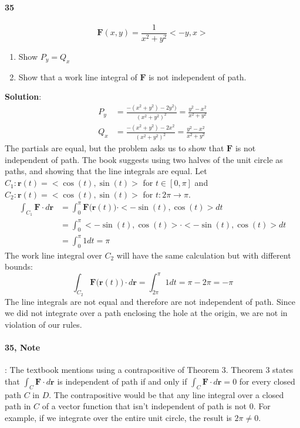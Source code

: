 \documentclass{article}
\begin{document}
    \paragraph{35}
    \[\mathbf{F}(x,y) = \frac{1}{x^2 + y^2}<-y, x>\]
    \begin{enumerate}[label=(\alph*)]
        \item Show $P_y = Q_x$
        \item Show that a work line integral of $\mathbf{F}$ is not independent of path.
    \end{enumerate}
    \textbf{Solution}:
    \begin{align*}
        P_y &= \frac{-(x^2+y^2)-2y^2)}{(x^2+y^2)^2} = \frac{y^2-x^2}{x^2+y^2}\\
        Q_x &= \frac{-(x^2+y^2)-2x^2}{(x^2+y^2)^2} = \frac{y^2-x^2}{x^2+y^2}
    \end{align*}
    The partials are equal, but the problem asks us to show that $\mathbf{F}$ is not independent of path.
    The book suggests using two halves of
    the unit circle as paths, and showing that the line integrals are equal.
    Let $C_1: \mathbf{r}(t) = <\cos(t), \sin(t)>$ for $t \in [0,\pi]$
    and $C_2: \mathbf{r}(t) = <\cos(t), \sin(t)>$ for $t: 2\pi \to \pi$.
    \begin{align*}
        \int_{C_1} \mathbf{F} \cdot d \mathbf{r} &= \int_{0}^{\pi} \mathbf{F(r}(t)) \cdot <-\sin(t), \cos(t)>dt\\
        &= \int_{0}^{\pi} <-\sin(t), \cos(t)> \cdot <-\sin(t), \cos(t)>dt \\
        &= \int_0^{\pi}1dt = \pi
    \end{align*}
    The work line integral over $C_2$ will have the same calculation but with different bounds:
    \[\int_{C_2} \mathbf{F(r}(t)) \cdot d\mathbf{r} = \int_{2\pi}^{\pi} 1 dt = \pi - 2\pi = -\pi\]
    The line integrals are not equal and therefore are not independent of path.
    Since we did not integrate over a path enclosing the hole at the origin, we are not in violation of our rules.
    \paragraph{35, Note}: The textbook mentions using a contrapositive of Theorem 3. Theorem 3 states that $\int_C \mathbf{F} \cdot d\mathbf{r}$ is independent
    of path if and only if $\int_C \mathbf{F} \cdot d\mathbf{r} = 0$ for every closed path $C$ in $D$.
    The contrapositive would be that any line integral over a closed path in $C$ of a vector function that isn't independent of path is not 0. For example,
    if we integrate over the entire unit circle, the result is $2\pi \neq 0$.
\end{document}
